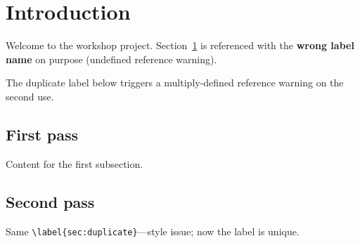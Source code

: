 \section{Introduction}\label{sec:intro}

Welcome to the workshop project. Section~\ref{sec:intro} is referenced with the
\textbf{wrong label name} on purpose (undefined reference warning).

The duplicate label below triggers a multiply-defined reference warning on the second use.

\subsection{First pass}\label{sec:duplicate}
Content for the first subsection.

\subsection{Second pass}\label{sec:duplicate-second}
Same \verb|\label{sec:duplicate}|---style issue; now the label is unique.
